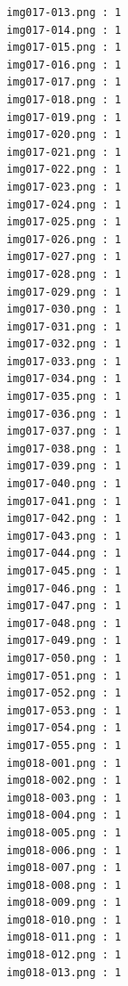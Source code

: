 \documentclass[12pt,a4paper]{article}
\begin{document}
\begin{lstlisting}
                     img017-013.png : 1
                     img017-014.png : 1
                     img017-015.png : 1
                     img017-016.png : 1
                     img017-017.png : 1
                     img017-018.png : 1
                     img017-019.png : 1
                     img017-020.png : 1
                     img017-021.png : 1
                     img017-022.png : 1
                     img017-023.png : 1
                     img017-024.png : 1
                     img017-025.png : 1
                     img017-026.png : 1
                     img017-027.png : 1
                     img017-028.png : 1
                     img017-029.png : 1
                     img017-030.png : 1
                     img017-031.png : 1
                     img017-032.png : 1
                     img017-033.png : 1
                     img017-034.png : 1
                     img017-035.png : 1
                     img017-036.png : 1
                     img017-037.png : 1
                     img017-038.png : 1
                     img017-039.png : 1
                     img017-040.png : 1
                     img017-041.png : 1
                     img017-042.png : 1
                     img017-043.png : 1
                     img017-044.png : 1
                     img017-045.png : 1
                     img017-046.png : 1
                     img017-047.png : 1
                     img017-048.png : 1
                     img017-049.png : 1
                     img017-050.png : 1
                     img017-051.png : 1
                     img017-052.png : 1
                     img017-053.png : 1
                     img017-054.png : 1
                     img017-055.png : 1
                     img018-001.png : 1
                     img018-002.png : 1
                     img018-003.png : 1
                     img018-004.png : 1
                     img018-005.png : 1
                     img018-006.png : 1
                     img018-007.png : 1
                     img018-008.png : 1
                     img018-009.png : 1
                     img018-010.png : 1
                     img018-011.png : 1
                     img018-012.png : 1
                     img018-013.png : 1




\end{lstlisting}
\end{document}
